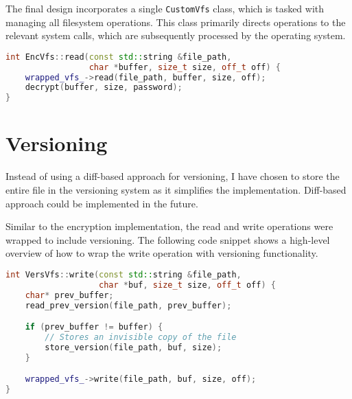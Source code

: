 The final design incorporates a single \texttt{CustomVfs} class, which is tasked with managing all filesystem operations.
This class primarily directs operations to the relevant system calls, which are subsequently processed by the operating system.

\begin{lstlisting}[language=c++, basicstyle=\ttfamily\small, caption={Wrapping the read operation with encryption.}, label={lst:read}]
int EncVfs::read(const std::string &file_path,
                 char *buffer, size_t size, off_t off) {
    wrapped_vfs_->read(file_path, buffer, size, off);
    decrypt(buffer, size, password);
}
\end{lstlisting}



\section{Versioning}\label{sec:versioning2}

Instead of using a diff-based approach for versioning, I have chosen to store the entire file in the versioning system as it simplifies the implementation.
Diff-based approach could be implemented in the future.

Similar to the encryption implementation, the read and write operations were wrapped to include versioning.
The following code snippet shows a high-level overview of how to wrap the write operation with versioning functionality.

\begin{lstlisting}[language=c++, basicstyle=\ttfamily\small]
int VersVfs::write(const std::string &file_path,
                   char *buf, size_t size, off_t off) {
    char* prev_buffer;
    read_prev_version(file_path, prev_buffer);

    if (prev_buffer != buffer) {
        // Stores an invisible copy of the file
        store_version(file_path, buf, size);
    }

    wrapped_vfs_->write(file_path, buf, size, off);
}
\end{lstlisting}

